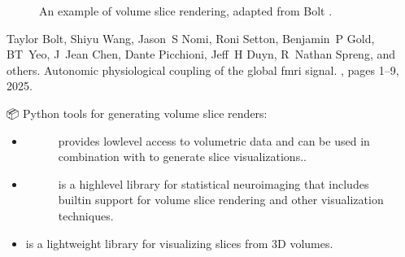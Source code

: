 \documentclass[letterpaper,10pt,english]{jupyterBook}
\begin{document}
\begin{figure}[htbp]
\centering
\capstart

\noindent{}
\caption{An example of volume slice rendering, adapted from Bolt \sphinxfootnotemark[1].}\label{\detokenize{chapters/03/03b_visualization-tools:vsr}}\end{figure}
%
\begin{footnotetext}[1]\sphinxAtStartFootnote
Taylor Bolt, Shiyu Wang, Jason S Nomi, Roni Setton, Benjamin P Gold, BT Yeo, J Jean Chen, Dante Picchioni, Jeff H Duyn, R Nathan Spreng, and others. Autonomic physiological coupling of the global fmri signal. , pages 1–9, 2025.
%
\end{footnotetext}\ignorespaces 
\sphinxAtStartPar
📦 Python tools for generating volume slice renders:
\begin{itemize}
\item {} 
\sphinxAtStartPar
{}

\begin{figure}[htbp]
\centering
\capstart

\noindent{}
\caption{ provides low\sphinxhyphen{}level access to volumetric data and can be used in combination with  to generate slice visualizations..}\label{\detokenize{chapters/03/03b_visualization-tools:nibabel}}\end{figure}

\item {} 
\sphinxAtStartPar
{}

\begin{figure}[htbp]
\centering
\capstart

\noindent{}
\caption{ is a high\sphinxhyphen{}level library for statistical neuroimaging that includes built\sphinxhyphen{}in support for volume slice rendering and other visualization techniques.}\label{\detokenize{chapters/03/03b_visualization-tools:nilearn-gallery}}\end{figure}

\item {} 
\sphinxAtStartPar
{} is a lightweight library for visualizing slices from 3D volumes.

\end{itemize}
\end{document}
